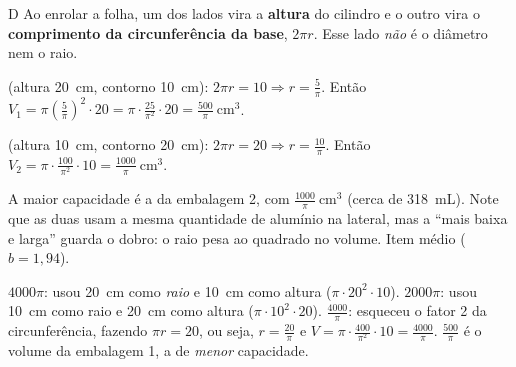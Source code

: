 \begin{resolucao}{D}
 Ao enrolar a folha, um dos lados vira a
\textbf{altura} do cilindro e o outro vira o \textbf{comprimento da circunferência
da base}, $2\pi r$. Esse lado \emph{não} é o diâmetro nem o raio.

 (altura 20~cm, contorno 10~cm):
$2\pi r = 10 \Rightarrow r = \frac{5}{\pi}$. Então
$V_1 = \pi\left(\frac{5}{\pi}\right)^2\cdot 20 = \pi\cdot\frac{25}{\pi^2}\cdot 20 = \frac{500}{\pi}\ \text{cm}^3$.

 (altura 10~cm, contorno 20~cm):
$2\pi r = 20 \Rightarrow r = \frac{10}{\pi}$. Então
$V_2 = \pi\cdot\frac{100}{\pi^2}\cdot 10 = \frac{1000}{\pi}\ \text{cm}^3$.

 A maior capacidade é a da embalagem 2, com
$\frac{1000}{\pi}\ \text{cm}^3$ (cerca de 318~mL). Note que as duas usam a mesma
quantidade de alumínio na lateral, mas a “mais baixa e larga” guarda o dobro:
o raio pesa ao quadrado no volume. Item médio ($b = 1{,}94$).

\begin{distratores}
 $4000\pi$: usou 20~cm como \emph{raio} e 10~cm como altura
($\pi\cdot 20^2\cdot 10$).
 $2000\pi$: usou 10~cm como raio e 20~cm como altura
($\pi\cdot 10^2\cdot 20$).
 $\frac{4000}{\pi}$: esqueceu o fator 2 da circunferência, fazendo
$\pi r = 20$, ou seja, $r = \frac{20}{\pi}$ e
$V = \pi\cdot\frac{400}{\pi^2}\cdot 10 = \frac{4000}{\pi}$.
 $\frac{500}{\pi}$ é o volume da embalagem 1, a de \emph{menor}
capacidade.
\end{distratores}
\end{resolucao}

